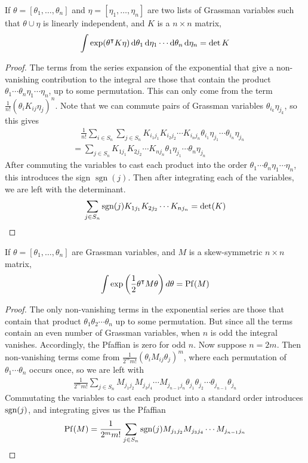 \begin{lem}
	If $\theta = [\theta_1,\ldots,\theta_n]$ and $\eta=[\eta_1,\ldots,\eta_n]$
	are two lists of Grassman variables such that $\theta\cup\eta$ is linearly
	independent, and $K$ is a  $n\times n$ matrix,
	\[
	\int \exp (\theta^\intercal K \eta) 
	\odif{\theta_1}\odif{\eta_1}\cdots\odif{\theta_n}\odif{\eta_n} = \det K
	\] 
\end{lem}
\begin{proof}
	The terms from the series expansion of the exponential that give a
	non-vanishing contribution to the integral are those that contain the product
	$\theta_1\cdots\theta_n\eta_1\cdots\eta_n$, up to some permutation.
	This can only come from the term $\frac{1}{n!}(\theta_i K_{ij} \eta_j)^n$. Note that we
	can commute pairs of Grassman variables $\theta_{i_k} \eta_{j_k}$, so this gives
	\begin{align*}
	&\quad \frac{1}{n!}\sum_{i\in S_n} \sum_{j\in S_n} 
	K_{i_1j_1}K_{i_2j_2} \cdots K_{i_nj_n} 
	\theta_{i_1}\eta_{j_1}\cdots \theta_{i_n}\eta_{j_n} \\
	&= \sum_{j\in S_n} K_{1j_1}K_{2j_2} \cdots K_{nj_n} \theta_1\eta_{j_1}\cdots
	\theta_n\eta_{j_n} 
	\end{align*}
	After commuting the variables to cast each product into the order 
	$\theta_1\cdots\theta_n\eta_1\cdots\eta_{n}$, this introduces the sign
	$\operatorname{sgn}(j)$. Then after integrating each of the variables, we
	are left with the determinant. 
	\[
		\sum_{j\in S_n} \operatorname{sgn}(j) K_{1j_1}K_{2j_2} \cdots K_{nj_n} = \det(K)
	\] 
\end{proof}
\begin{lem} \label{lem:berezin_pf}
	If $\theta = [\theta_1,\ldots,\theta_n]$ are Grassman
	variables, and $M$ is a skew-symmetric  $n\times n$ matrix,
	\[
	\int \exp\paren{\frac{1}{2}\theta^{\intercal}M\theta} d\theta = \Pf(M)
	\] 
\end{lem}
\begin{proof}
	The only non-vanishing terms in the exponential series are those that
	contain that product $\theta_1\theta_2\cdots\theta_n$ up to some
	permutation. But since all the terms contain an even number of Grassman
	variables, when  $n$ is odd the integral vanishes. Accordingly, the Pfaffian
	is zero for odd $n$.
	Now suppose  $n=2m$.
	Then non-vanishing terms come from
	$\frac{1}{2^mm!}(\theta_iM_{ij}\theta_j)^m$, where each permutation of
	$\theta_1\cdots\theta_n$ occurs once, so we are left with
	\begin{align*}
		\frac{1}{2^mm!}\sum_{j\in S_n} M_{j_1j_2}M_{j_3j_4}\cdots M_{j_{n-1}j_n}
		\theta_{j_1}\theta_{j_2}\cdots \theta_{j_{n-1}}\theta_{j_n}
	\end{align*}
	Commutating the variables to cast each product into a standard order
	introduces $\operatorname{sgn}(j)$, and integrating gives us the Pfaffian
	\[
	\operatorname{Pf}(M) = \frac{1}{2^{m}m!} \sum_{j\in S_n} \operatorname{sgn}(j)
	M_{j_1j_2}M_{j_3j_4}\cdots M_{j_{n-1}j_n}
	\] 
\end{proof}

